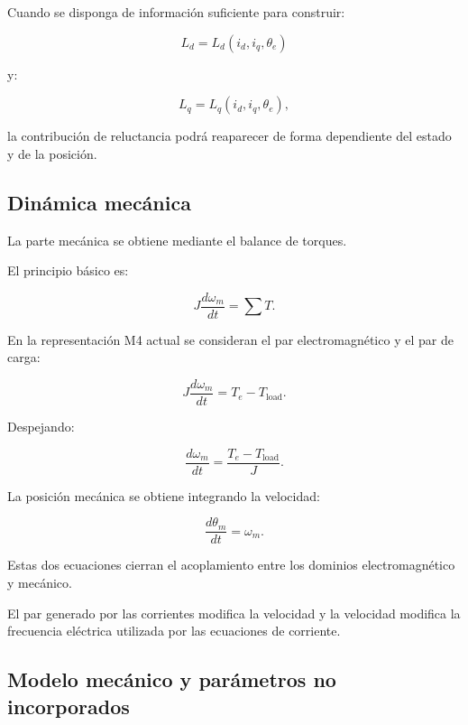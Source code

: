 Cuando se disponga de información suficiente para construir:

\begin{equation}
L_d=L_d(i_d,i_q,\theta_e)
\end{equation}

y:

\begin{equation}
L_q=L_q(i_d,i_q,\theta_e),
\end{equation}

la contribución de reluctancia podrá reaparecer de forma dependiente del estado y de la posición.

\subsection{Dinámica mecánica}

La parte mecánica se obtiene mediante el balance de torques.

El principio básico es:

\begin{equation}
J\frac{d\omega_m}{dt}
=
\sum T.
\end{equation}

En la representación M4 actual se consideran el par electromagnético y el par de carga:

\begin{equation}
J\frac{d\omega_m}{dt}
=
T_e-T_{\mathrm{load}}.
\end{equation}

Despejando:

\begin{equation}
\frac{d\omega_m}{dt}
=
\frac{T_e-T_{\mathrm{load}}}{J}.
\end{equation}

La posición mecánica se obtiene integrando la velocidad:

\begin{equation}
\frac{d\theta_m}{dt}
=
\omega_m.
\end{equation}

Estas dos ecuaciones cierran el acoplamiento entre los dominios electromagnético y mecánico.

El par generado por las corrientes modifica la velocidad y la velocidad modifica la frecuencia eléctrica utilizada por las ecuaciones de corriente.

\subsection{Modelo mecánico y parámetros no incorporados}

